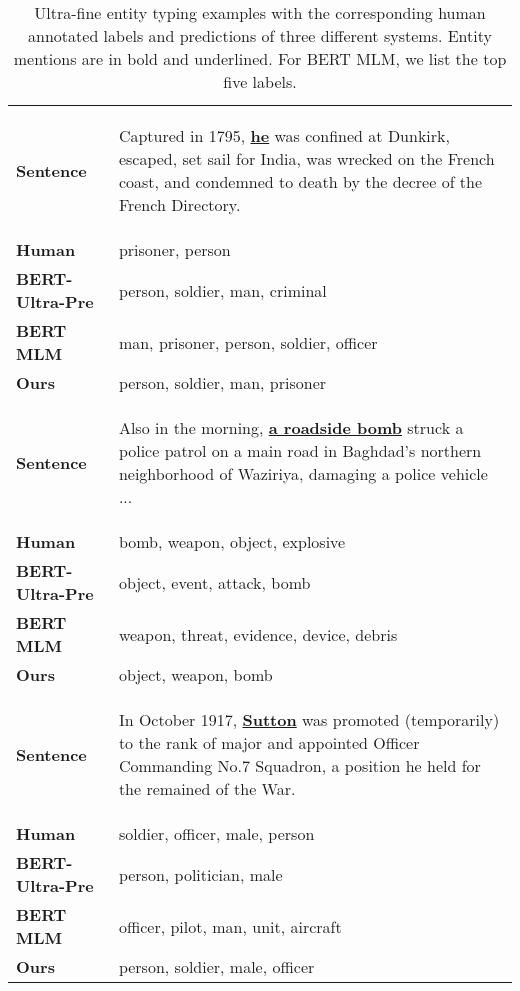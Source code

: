 \documentclass[11pt,a4paper]{article}
\begin{document}
\begin{table}[t]
\centering
{\small
\begin{tabular}{lp{}}
\hline 
\textbf{Sentence} &
\begin{tcolorbox} Captured in 1795, \underline{\textbf{he}} was confined at Dunkirk, escaped, set sail for India, was wrecked on the French coast, and condemned to death by the decree of the French Directory.\end{tcolorbox} \\
\textbf{Human} & prisoner, person \\
\textbf{BERT-Ultra-Pre} & person, soldier, man, criminal \\
\textbf{BERT MLM} & man, prisoner, person, soldier, officer \\
\textbf{Ours} & person, soldier, man, prisoner \\
\hline
\textbf{Sentence} & \begin{tcolorbox} Also in the morning, \underline{\textbf{a roadside bomb}} struck a police patrol on a main road in Baghdad's northern neighborhood of Waziriya, damaging a police vehicle ...\end{tcolorbox} \\
\textbf{Human} & bomb, weapon, object, explosive \\
\textbf{BERT-Ultra-Pre} & object, event, attack, bomb \\
\textbf{BERT MLM} & weapon, threat, evidence, device, debris \\
\textbf{Ours} & object, weapon, bomb \\
\hline
\textbf{Sentence} & \begin{tcolorbox} In October 1917, \underline{\textbf{Sutton}} was promoted (temporarily) to the rank of major and appointed Officer Commanding No.7 Squadron, a position he held for the remained of the War.\end{tcolorbox} \\
\textbf{Human} & soldier, officer, male, person \\
\textbf{BERT-Ultra-Pre} & person, politician, male \\
\textbf{BERT MLM} & officer, pilot, man, unit, aircraft \\
\textbf{Ours} & person, soldier, male, officer \\
\hline
\end{tabular}
}
\caption{\label{tab:cases} Ultra-fine entity typing examples with the corresponding human annotated labels and predictions of three different systems. Entity mentions are in bold and underlined. For BERT MLM, we list the top five labels.}
\end{table}
\end{document}
